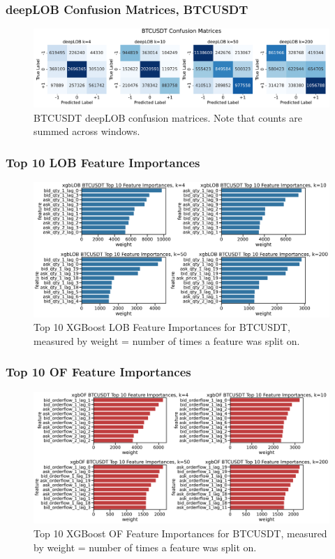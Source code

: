 \documentclass[handout]{beamer}
\begin{document}
\begin{frame}
    \frametitle{deepLOB Confusion Matrices, BTCUSDT}
    \begin{figure}[htpb!]
        \centering
        \includegraphics[width=1.0\textwidth]{./images/BTCUSDT_deepLOB_confusion_matrices.pdf}
        \caption{BTCUSDT deepLOB confusion matrices. Note that counts are summed across windows.}
    \end{figure}
\end{frame}


\begin{frame}
    \frametitle{Top 10 LOB Feature Importances}
    \begin{figure}[htpb]
        \centering
        \includegraphics[width=1.0\textwidth]{./images/xgboost_LOB_BTCUSDT_top_10_feature_importances.pdf}
        \caption{Top 10 XGBoost LOB Feature Importances for BTCUSDT, measured by weight = number of times a feature was split on.}
    \end{figure}
\end{frame}

\begin{frame}
    \frametitle{Top 10 OF Feature Importances}
    \begin{figure}[htpb]
        \centering
        \includegraphics[width=1.0\textwidth]{./images/xgboost_OF_BTCUSDT_top_10_feature_importances.pdf}
        \caption{Top 10 XGBoost OF Feature Importances for BTCUSDT, measured by weight = number of times a feature was split on.}
    \end{figure}
\end{frame}
\end{document}
